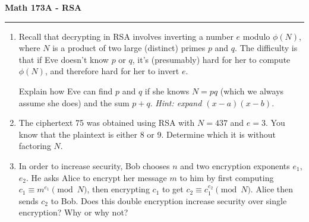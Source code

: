 \documentclass[11pt,letterpaper]{article}
\begin{document}
\begin{center}
{\bf \Large Math 173A - RSA}
\vspace{0.2cm}
\hrule
\end{center}

\begin{enumerate}

    \item Recall that decrypting in RSA involves inverting a number $e$ modulo $\phi(N)$, where $N$ is a product of two large (distinct) primes $p$ and $q$.
    The difficulty is that if Eve doesn't know $p$ or $q$, it's (presumably) hard for her to compute $\phi(N)$, and therefore hard for her to invert $e$.

    Explain how Eve can find $p$ and $q$ if she knows $N = pq$ (which we always assume she does) and the sum $p+q$. \textit{Hint: expand $(x-a)(x-b)$.}

    \vfill


    \item The ciphertext 75 was obtained using RSA with $N = 437$ and $e=3$.
    You know that the plaintext is either 8 or 9.
    Determine which it is without factoring $N$.

    \vfill

    \item In order to increase security, Bob chooses $n$ and two encryption exponents $e_1$, $e_2$.
    He asks Alice to encrypt her message $m$ to him by first computing $c_1 \equiv m^{e_1}\pmod N$, then encrypting $c_1$ to get $c_2\equiv c_1^{e_2}\pmod N$.
    Alice then sends $c_2$ to Bob.
    Does this double encryption increase security over single encryption?
    Why or why not?

    \vfill

\end{enumerate}
\end{document}
